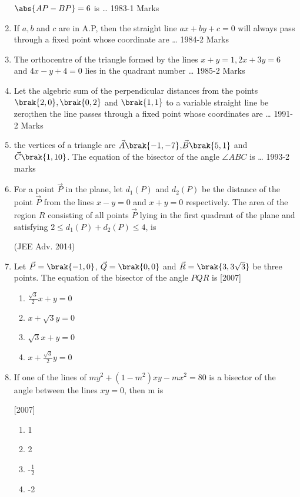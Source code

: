 \begin{enumerate}
    $\abs{AP-BP}=6$ is \dots
    \hfill{1983-1 Marks}
    \item If $a,b$ and $c$ are in A.P, then the straight line $ax +by +c=0$ will always pass through a fixed point whose coordinate are \dots
    \hfill{1984-2 Marks}
    \item The orthocentre of the triangle formed by the lines $x+y=1,2x +3y=6$ and $4x-y+4=0$ lies in the quadrant number \dots
    \hfill{1985-2 Marks}
    \item Let the algebric sum of the perpendicular distances from the points $\brak{2,0},\brak{0,2}$ and $\brak{1,1}$ to a variable straight line be zero;then the line passes through a fixed point whose coordinates are \dots
    \hfill{1991-2 Marks}
    \item the vertices of a triangle are $\vec{A}\brak{-1,-7}$,$\vec{B}\brak{5,1}$ and $\vec{C}\brak{1,10}$. The equation of the bisector of the angle $\angle{ABC}$ is \dots
    \hfill{1993-2 marks}
	\item For a point $\vec{P}$ in the plane, let $d_{1}(P)$ and $d_{2}(P)$ be the 
		distance of the point $\vec{P}$ from the lines $x-y=0$ and $x+y =0$ 
respectively. The area of the region $R$ consisting of all points 
		$\vec{P}$ lying in the first quadrant of the plane and satisfying
$2\leq d_{1}(P)+d_{2}(P) \leq4$, is

		\hfill{(JEE Adv. 2014)}
	\item Let $\vec{P}=\brak{-1, 0}$, $\vec{Q}=\brak{0, 0}$ and $\vec{R}=\brak{3, 3\sqrt{3}}$ be three points. The equation of the bisector of the angle $PQR$ is \hfill{[2007]}
\begin{multicols}{2}
\begin{enumerate}
\item $\frac{\sqrt{3}}{2}x+y=0$
\item $x+\sqrt{3}y=0$
\item $\sqrt{3}x+y=0$
\item $x+\frac{\sqrt{3}}{2}y=0$
\end{enumerate}
\end{multicols}

\item If one of the lines of $my^{2}+(1-m^{2})xy-mx^{2}=80$ is a bisector 
of the angle between the lines $xy=0$, then m is

\hfill{[2007]}
\begin{multicols}{4}
\begin{enumerate}
\item 1
\item 2
\item -$\frac{1}{2}$
\item -2
\end{enumerate}
\end{multicols}


\end{enumerate}
